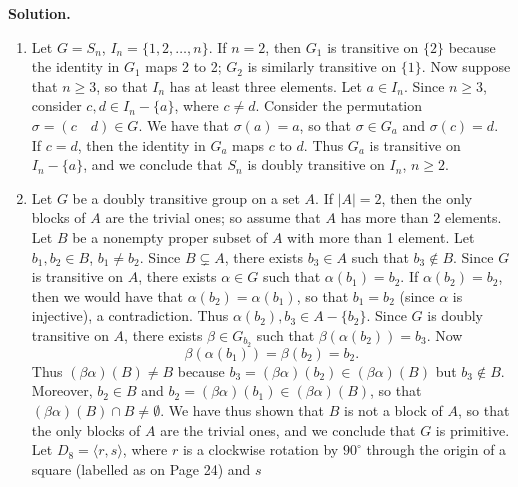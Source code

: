 \documentclass[9pt]{article}
\newcommand{\cyc}[1]{\langle #1 \rangle}
\begin{document}
\begin{enumerate}
      \textbf{Solution.}
      
      \begin{enumerate}
         \item Let $G = S_n$, $I_n = \{1, 2, \ldots, n\}$. If $n = 2$, then
               $G_1$ is transitive on $\{2\}$ because the identity in $G_1$ maps
               2 to 2; $G_2$ is similarly transitive on $\{1\}$. Now suppose
               that $n \ge 3$, so that $I_n$ has at least three elements. Let
               $a \in I_n$. Since $n \ge 3$, consider $c, d \in I_n - \{a\}$,
               where $c \neq d$. Consider the permutation
               $\sigma = (c \quad d) \in G$. We have that $\sigma(a) = a$, so
               that $\sigma \in G_a$ and $\sigma(c) = d$. If $c = d$, then the
               identity in $G_a$ maps $c$ to $d$. Thus $G_a$ is transitive on
               $I_n - \{a\}$, and we conclude that $S_n$ is doubly transitive on
               $I_n$, $n \ge 2$.
         \item Let $G$ be a doubly transitive group on a set $A$. If $|A| = 2$,
               then the only blocks of $A$ are the trivial ones; so assume that
               $A$ has more than 2 elements. Let $B$ be a nonempty proper subset of
               $A$ with more than 1 element. Let $b_1, b_2 \in B$,
               $b_1 \neq b_2$. Since $B \subsetneq A$, there exists $b_3 \in A$
               such that $b_3 \notin B$. Since $G$ is transitive on $A$, there
               exists $\alpha \in G$ such that $\alpha(b_1) = b_2$. If
               $\alpha(b_2) = b_2$, then we would have that
               $\alpha(b_2) = \alpha(b_1)$, so that $b_1 = b_2$ (since $\alpha$
               is injective), a contradiction. Thus
               $\alpha(b_2), b_3 \in A - \{b_2\}$. Since $G$ is doubly
               transitive on $A$, there exists $\beta \in G_{b_2}$ such that
               $\beta(\alpha(b_2)) = b_3$. Now
               $$\beta(\alpha(b_1)) = \beta(b_2) = b_2.$$
               Thus $(\beta\alpha)(B) \neq B$ because
               $b_3 = (\beta\alpha)(b_2) \in (\beta\alpha)(B)$ but
               $b_3 \notin B$. Moreover, $b_2 \in B$ and
               $b_2 = (\beta\alpha)(b_1) \in (\beta\alpha)(B)$, so that
               $(\beta\alpha)(B) \cap B \neq \emptyset$. We have thus shown
               that $B$ is not a block of $A$, so that the only blocks of $A$
               are the trivial ones, and we conclude that $G$ is primitive. Let
               $D_8 = \cyc{r, s}$, where $r$ is a clockwise rotation by $90^\circ$
               through the origin of a square (labelled as on Page 24) and $s$

\end{enumerate}
\end{enumerate}
\end{document}
